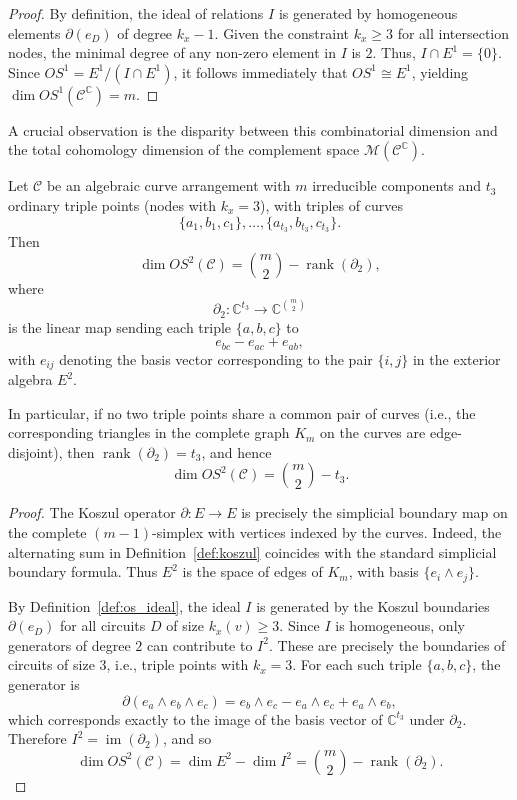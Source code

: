 \documentclass[article,11pt]{amsart} \numberwithin{equation}{section}
\numberwithin{equation}{section}
\begin{document}
{\begin{proof}
	By definition, the ideal of relations $I$ is generated by homogeneous elements $\partial(e_D)$ of degree $k_x - 1$. Given the constraint $k_x \ge 3$ for all intersection nodes, the minimal degree of any non-zero element in $I$ is $2$. Thus, $I \cap E^1 = \{0\}$. Since $OS^1 = E^1 / (I \cap E^1)$, it follows immediately that $OS^1 \cong E^1$, yielding $\dim OS^1(\mathcal{C}^\mathbb{C}) = m$.
\end{proof}

A crucial observation is the disparity between this combinatorial dimension and the total cohomology dimension of the complement space $\mathcal{M}(\mathcal{C}^\mathbb{C})$.

\begin{inp}
	\label{prop:dim_os2}
	Let $\mathcal C$ be an algebraic curve arrangement with $m$ irreducible components and $t_3$ ordinary triple points (nodes with $k_x=3$), with triples of curves
	\[
	\{a_1,b_1,c_1\},\dots,\{a_{t_3},b_{t_3},c_{t_3}\}.
	\]
	Then
	\[
	\dim OS^2(\mathcal C) = \binom{m}{2} - \operatorname{rank}(\partial_2),
	\]
	where
	\[
	\partial_2: \mathbb C^{t_3} \longrightarrow \mathbb C^{\binom{m}{2}}
	\]
	is the linear map sending each triple $\{a,b,c\}$ to
	\[
	e_{bc} - e_{ac} + e_{ab},
	\]
	with $e_{ij}$ denoting the basis vector corresponding to the pair $\{i,j\}$ in the exterior algebra $E^2$.
	
	In particular, if no two triple points share a common pair of curves (i.e., the corresponding triangles in the complete graph $K_m$ on the curves are edge-disjoint), then $\operatorname{rank}(\partial_2)=t_3$, and hence
	\[
	\dim OS^2(\mathcal C) = \binom{m}{2} - t_3.
	\]
\end{inp}

\begin{proof}
	The Koszul operator $\partial:E\longrightarrow E$ is precisely the simplicial boundary map on the complete $(m-1)$-simplex with vertices indexed by the curves. Indeed, the alternating sum in Definition~\ref{def:koszul} coincides with the standard simplicial boundary formula. Thus $E^2$ is the space of edges of $K_m$, with basis $\{e_i\wedge e_j\}$.
	
	By Definition~\ref{def:os_ideal}, the ideal $I$ is generated by the Koszul boundaries $\partial(e_D)$ for all circuits $D$ of size $k_x(v)\ge 3$. Since $I$ is homogeneous, only generators of degree $2$ can contribute to $I^2$. These are precisely the boundaries of circuits of size $3$, i.e., triple points with $k_x=3$. For each such triple $\{a,b,c\}$, the generator is
	\[
	\partial(e_a\wedge e_b\wedge e_c)=e_b\wedge e_c - e_a\wedge e_c + e_a\wedge e_b,
	\]
	which corresponds exactly to the image of the basis vector of $\mathbb C^{t_3}$ under $\partial_2$. Therefore $I^2 = \operatorname{im}(\partial_2)$, and so
	\[
	\dim OS^2(\mathcal C) = \dim E^2 - \dim I^2 = \binom{m}{2} - \operatorname{rank}(\partial_2).
	\]
	

\end{proof}}
\end{document}
